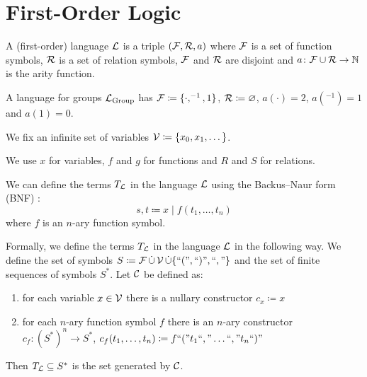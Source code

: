 \section{First-Order Logic}

\begin{boxdef}
\begin{defi}
A (first-order) \alert{language $\mathcal{L}$} is a triple $(\mathcal{F}, \mathcal{R}, a)$ where $\mathcal{F}$ is a set of function symbols, $\mathcal{R}$ is a set of relation symbols, $\mathcal{F}$ and $\mathcal{R}$ are disjoint and $a \colon \mathcal{F} \cup \mathcal{R} \to \mathbb{N}$ is the arity function.
\end{defi}
\end{boxdef}

\begin{example}
A language for groups $\mathcal{L}_{\text{Group}}$ has $\mathcal{F} \coloneq \{\cdot, ^{-1}, 1 \}$, $\mathcal{R} \coloneq \varnothing$, $a(\cdot) = 2$, $a(^{-1}) = 1$ and $a(1) = 0$.
\end{example}

\begin{boxdef}
\begin{defi}
We fix an infinite set of \alert{variables} $\mathcal{V} \coloneq \{ x_0, x_1, \dots \}$.
\end{defi}
\end{boxdef}

\begin{rem}
We use $x$ for variables, $f$ and $g$ for functions and $R$ and $S$ for relations.
\end{rem}

\begin{boxdef}
\begin{defi}
We can define the \alert{terms $T_{\mathcal{L}}$} in the language $\mathcal{L}$ using the \alert{Backus–Naur form (BNF)} : 
\begin{equation*}
    s, t \Coloneqq x \mid f(t_1, \dots, t_n)
\end{equation*}
where $f$ is an $n$-ary function symbol.
\end{defi}
\end{boxdef}

\begin{boxdef}
\begin{defi}
Formally, we define the \alert{terms $T_{\mathcal{L}}$} in the language $\mathcal{L}$ in the following way. We define the set of \alert{symbols} $S \coloneq \mathcal{F} \operatorname{\dot{\cup}} \mathcal{V} \operatorname{\dot{\cup}} \{\text{``} ( \text{''}, \text{``} ) \text{''}, \text{``} , \text{''} \}$ and the set of finite sequences of symbols $S^*$. 
Let $\mathcal{C}$ be defined as: 
\begin{enumerate}
    \item for each variable $x \in \mathcal{V}$ there is a nullary constructor $c_x \coloneq x$
    \item for each $n$-ary function symbol $f$ there is an $n$-ary constructor $c_f \colon (S^*)^n \to S^*$, $c_f(t_1, \dots, t_n) \coloneq f\text{``} ( \text{''}t_1\text{``} , \text{''} \dots \text{``} , \text{''} t_n \text{``} ) \text{''}$
\end{enumerate}
Then $T_{\mathcal{L}} \subseteq S^*$ is the set generated by $\mathcal{C}$.
\end{defi}
\end{boxdef}

